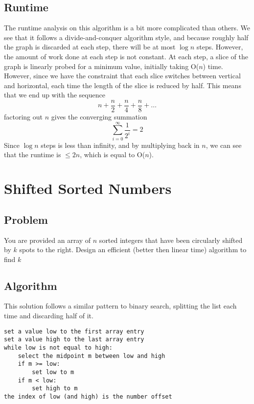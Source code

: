 \documentclass[titlepage]{article}
\numberwithin{equation}{subsection}
\begin{document}
\subsection{Runtime}
The runtime analysis on this algorithm is a bit more complicated than others. We see that it follows a
divide-and-conquer algorithm style, and because roughly half the graph is discarded at each step, there will
be at most $\log n$ steps. However, the amount of work done at each step is not constant. At each step, a slice
of the graph is linearly probed for a minimum value, initially taking O($n$) time. However, since we have the constraint
that each slice switches between vertical and horizontal, each time the length of the slice is reduced by half.
This means that we end up with the sequence
\begin{equation}
    n + \frac{n}{2} + \frac{n}{4} + \frac{n}{8} + \dots
\end{equation}
factoring out $n$ gives the converging summation
\begin{equation}
    \sum_{i=0}^{\infty} \frac{1}{2^i} = 2
\end{equation}
Since $\log n$ steps is less than infinity, and by multiplying back in $n$, we can see that the runtime is 
$\leq 2n$, which is equal to O($n$).
\section{Shifted Sorted Numbers}
\subsection{Problem}
You are provided an array of $n$ sorted integers that have been circularly shifted by $k$ spots to the
right. Design an efficient (better then linear time) algorithm to find $k$
\subsection{Algorithm}
This solution follows a similar pattern to binary search, splitting the list each time and discarding half of it.\\
\begin{minipage}{\linewidth}
\begin{lstlisting}
set a value low to the first array entry
set a value high to the last array entry
while low is not equal to high:
    select the midpoint m between low and high
    if m >= low:
        set low to m
    if m < low:
        set high to m
the index of low (and high) is the number offset
\end{lstlisting}
\end{minipage}
\end{document}
